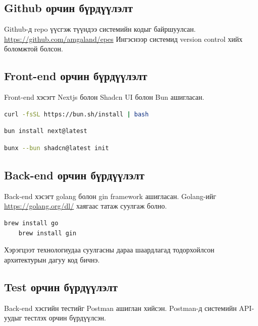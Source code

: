 \subsection{Github орчин бүрдүүлэлт}
Github-д repo үүсгэж түүндээ системийн кодыг байршуулсан. \url{https://github.com/amgaland/epes}
Ингэснээр системид version control хийх боломжтой болсон.

\subsection{Front-end орчин бүрдүүлэлт}
Front-end хэсэгт Nextjs болон Shadcn UI болон Bun ашигласан.
\begin{lstlisting}[language=zsh, caption=Bun суулгах, frame=single]
    curl -fsSL https://bun.sh/install | bash
\end{lstlisting}

\begin{lstlisting}[language=zsh, caption=Nextjs суулгах, frame=single]
    bun install next@latest
\end{lstlisting}

\begin{lstlisting}[language=zsh, caption=Shadcn суулгах, frame=single]
    bunx --bun shadcn@latest init
\end{lstlisting}

\subsection{Back-end орчин бүрдүүлэлт}
Back-end хэсэгт golang болон gin framework ашигласан. Golang-ийг \url{https://golang.org/dl/} хаягаас татаж суулгаж болно.
\begin{lstlisting}[language=zsh, caption=Golang суулгах, frame=single]
    brew install go
    brew install gin
\end{lstlisting}

Хэрэгцээт технологиудаа суулгасны дараа шаардлагад тодорхойлсон архитектурын дагуу код бичнэ.
\subsection{Test орчин бүрдүүлэлт}

Back-end хэсгийн тестийг Postman ашиглан хийсэн. Postman-д системийн API-уудыг тестлэх орчин бүрдүүлсэн.

